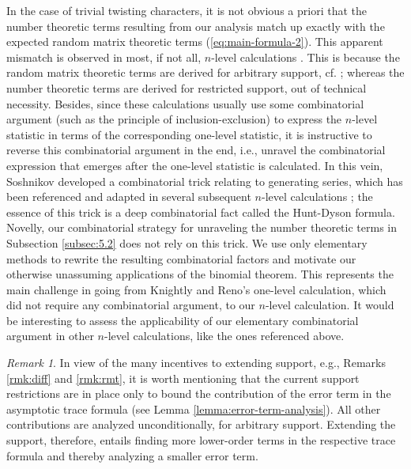 \documentclass[12pt, reqno,oneside]{amsart}
\theoremstyle{plain}
\theoremstyle{definition}
\theoremstyle{remark}
\newtheorem{remark}[theorem]{Remark}
\theoremstyle{plain}
\numberwithin{equation}{section}
\begin{document}
In the case of trivial twisting characters, it is not obvious a priori that the number theoretic terms resulting from our analysis match up exactly with the expected random matrix theoretic terms (\ref{eq:main-formula-2}). This apparent mismatch is observed in most, if not all, $n$-level calculations \cite{Rub01, Gao08, HM07, HR02, Sos00}. This is because the random matrix theoretic terms are derived for arbitrary support, cf. \cite{KS99a, KS99b}; whereas the number theoretic terms are derived for restricted support, out of technical necessity. Besides, since these calculations usually use some combinatorial argument (such as the principle of inclusion-exclusion) to express the $n$-level statistic in terms of the corresponding one-level statistic, it is instructive to reverse this combinatorial argument in the end, i.e., unravel the combinatorial expression that emerges after the one-level statistic is calculated. In this vein, Soshnikov \cite{Sos00} developed a combinatorial trick relating to generating series, which has been referenced and adapted in several subsequent $n$-level calculations \cite{HM07, HR02}; the essence of this trick is a deep combinatorial fact called the Hunt-Dyson formula. Novelly, our combinatorial strategy for unraveling the number theoretic terms in Subsection \ref{subsec:5.2} does not rely on this trick. We use only elementary methods to rewrite the resulting combinatorial factors and motivate our otherwise unassuming applications of the binomial theorem. This represents the main challenge in going from Knightly and Reno's one-level calculation, which did not require any combinatorial argument, to our $n$-level calculation. It would be interesting to assess the applicability of our elementary combinatorial argument in other $n$-level calculations, like the ones referenced above. 

\begin{remark}\label{rmk:support}
In view of the many incentives to extending support, e.g., Remarks \ref{rmk:diff} and \ref{rmk:rmt}, it is worth mentioning that the current support restrictions are in place only to bound the contribution of the error term in the asymptotic trace formula (see Lemma \ref{lemma:error-term-analysis}). All other contributions are analyzed unconditionally, for arbitrary support. Extending the support, therefore, entails finding more lower-order terms in the respective trace formula and thereby analyzing a smaller error term. 
\end{remark}
%
%
\end{document}
